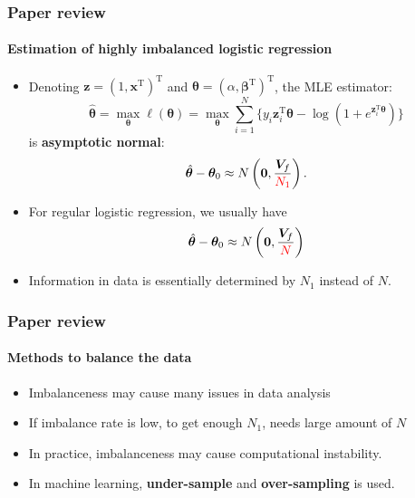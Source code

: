 \documentclass{beamer}
\newcommand{\red}{\color{red}}
\newcommand{\blue}{\color{blue}}
\newcommand{\bbeta}{\bm{\beta}}
\newcommand{\btheta}{\bm{\theta}}
\newcommand{\htheta}{\hat{\bm{\theta}}}
\newcommand{\x}{\bm{x}}
\newcommand{\z}{\bm{z}}
\newcommand{\tp}{^{\mathrm{T}}}
\newcommand{\rhl}[1]{{\red \textbf{#1}}}
\newcommand{\bhl}[1]{{\blue \textbf{#1}}}
\begin{document}
    \begin{frame}
        \frametitle{Paper review}
        \framesubtitle{Estimation of highly imbalanced logistic regression}
        \begin{itemize}
            \item Denoting $\z=(1,\x\tp)\tp$ and $\btheta=(\alpha,\bbeta\tp)\tp$, the MLE estimator:
        \begin{equation*}
            \htheta=\max_{\btheta}\ell(\btheta)=\max_{\btheta}\sum_{i=1}^{N}\{y_i\z_i\tp\btheta-\log(1+e^{\z_i\tp\btheta})\}
        \end{equation*}
        is \bhl{asymptotic normal}:
        \begin{equation*}
            \htheta-\btheta_0\approx N\left(\bm{0}, \frac{\bm{V}_f}{{\red N_1}}\right).
        \end{equation*}
        \end{itemize}
        \begin{itemize}
            \item For regular logistic regression, we usually have
            \begin{equation*}
                \htheta-\btheta_0\approx N\left(\bm{0}, \frac{\bm{V}_f}{{\red N}}\right)
            \end{equation*}
            \item Information in data is essentially determined by $N_1$ instead of $N$.
        \end{itemize}
    \end{frame}

    \begin{frame}
        \frametitle{Paper review}
        \framesubtitle{Methods to balance the data}
        \begin{itemize}
            \item Imbalanceness may cause many issues in data analysis
            \item If imbalance rate is low, to get enough $N_1$, needs large amount of $N$
            \item In practice, imbalanceness may cause computational instability.
            \item In machine learning, \rhl{under-sample} and \rhl{over-sampling} is used.
        \end{itemize}
    \end{frame}
\end{document}

